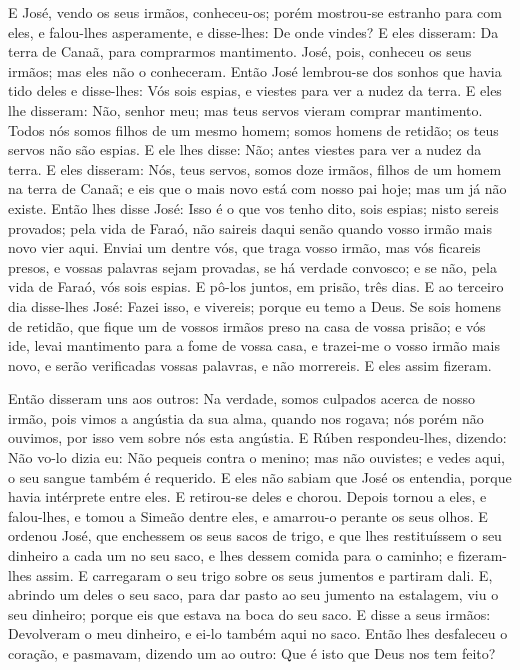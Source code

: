 E José, vendo os seus irmãos, conheceu-os; porém mostrou-se
estranho para com eles, e falou-lhes asperamente, e disse-lhes: De
onde vindes? E eles disseram: Da terra de Canaã, para comprarmos
mantimento. José, pois, conheceu os seus irmãos; mas eles não o
conheceram. Então José lembrou-se dos sonhos que havia tido
deles e disse-lhes: Vós sois espias, e viestes para ver a nudez da
terra. E eles lhe disseram: Não, senhor meu; mas teus servos
vieram comprar mantimento. Todos nós somos filhos de um mesmo
homem; somos homens de retidão; os teus servos não são espias.
E ele lhes disse: Não; antes viestes para ver a nudez da
terra. E eles disseram: Nós, teus servos, somos doze irmãos,
filhos de um homem na terra de Canaã; e eis que o mais novo está com
nosso pai hoje; mas um já não existe. Então lhes disse José:
Isso é o que vos tenho dito, sois espias; nisto sereis
provados; pela vida de Faraó, não saireis daqui senão quando vosso
irmão mais novo vier aqui. Enviai um dentre vós, que traga
vosso irmão, mas vós ficareis presos, e vossas palavras sejam
provadas, se há verdade convosco; e se não, pela vida de Faraó, vós
sois espias. E pô-los juntos, em prisão, três dias. E
ao terceiro dia disse-lhes José: Fazei isso, e vivereis; porque eu
temo a Deus. Se sois homens de retidão, que fique um de
vossos irmãos preso na casa de vossa prisão; e vós ide, levai
mantimento para a fome de vossa casa, e trazei-me o vosso
irmão mais novo, e serão verificadas vossas palavras, e não
morrereis. E eles assim fizeram.

Então disseram uns aos outros: Na verdade, somos culpados acerca
de nosso irmão, pois vimos a angústia da sua alma, quando nos
rogava; nós porém não ouvimos, por isso vem sobre nós esta angústia.
E Rúben respondeu-lhes, dizendo: Não vo-lo dizia eu: Não
pequeis contra o menino; mas não ouvistes; e vedes aqui, o seu
sangue também é requerido. E eles não sabiam que José os
entendia, porque havia intérprete entre eles. E retirou-se
deles e chorou. Depois tornou a eles, e falou-lhes, e tomou a Simeão
dentre eles, e amarrou-o perante os seus olhos. E ordenou
José, que enchessem os seus sacos de trigo, e que lhes restituíssem
o seu dinheiro a cada um no seu saco, e lhes dessem comida para o
caminho; e fizeram-lhes assim. E carregaram o seu trigo sobre
os seus jumentos e partiram dali. E, abrindo um deles o seu
saco, para dar pasto ao seu jumento na estalagem, viu o seu
dinheiro; porque eis que estava na boca do seu saco. E disse
a seus irmãos: Devolveram o meu dinheiro, e ei-lo também aqui no
saco. Então lhes desfaleceu o coração, e pasmavam, dizendo um ao
outro: Que é isto que Deus nos tem feito?

